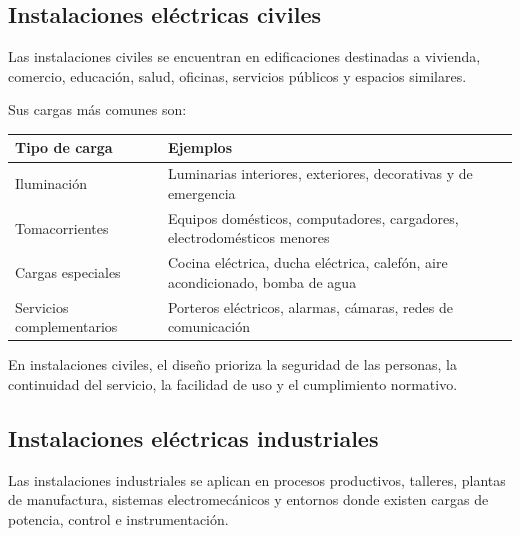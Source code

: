 \documentclass[
  spanish,
  letterpaper,
  DIV=11,
  numbers=noendperiod]{scrreprt}
\newcounter{none} %
\begin{document}
\subsection{Instalaciones eléctricas
civiles}\label{instalaciones-eluxe9ctricas-civiles}

Las instalaciones civiles se encuentran en edificaciones destinadas a
vivienda, comercio, educación, salud, oficinas, servicios públicos y
espacios similares.

Sus cargas más comunes son:

{\def\LTcaptype{none} %
\begin{longtable}[]{@{}
  >{\raggedright\arraybackslash}p{}
  >{\raggedright\arraybackslash}p{}@{}}
\toprule\noalign{}
\begin{minipage}[b]{\linewidth}\raggedright
Tipo de carga
\end{minipage} & \begin{minipage}[b]{\linewidth}\raggedright
Ejemplos
\end{minipage} \\
\midrule\noalign{}
\endhead
\bottomrule\noalign{}
\endlastfoot
Iluminación & Luminarias interiores, exteriores, decorativas y de
emergencia \\
Tomacorrientes & Equipos domésticos, computadores, cargadores,
electrodomésticos menores \\
Cargas especiales & Cocina eléctrica, ducha eléctrica, calefón, aire
acondicionado, bomba de agua \\
Servicios complementarios & Porteros eléctricos, alarmas, cámaras, redes
de comunicación \\
\end{longtable}
}

En instalaciones civiles, el diseño prioriza la seguridad de las
personas, la continuidad del servicio, la facilidad de uso y el
cumplimiento normativo.

\subsection{Instalaciones eléctricas
industriales}\label{instalaciones-eluxe9ctricas-industriales}

Las instalaciones industriales se aplican en procesos productivos,
talleres, plantas de manufactura, sistemas electromecánicos y entornos
donde existen cargas de potencia, control e instrumentación.
\end{document}
